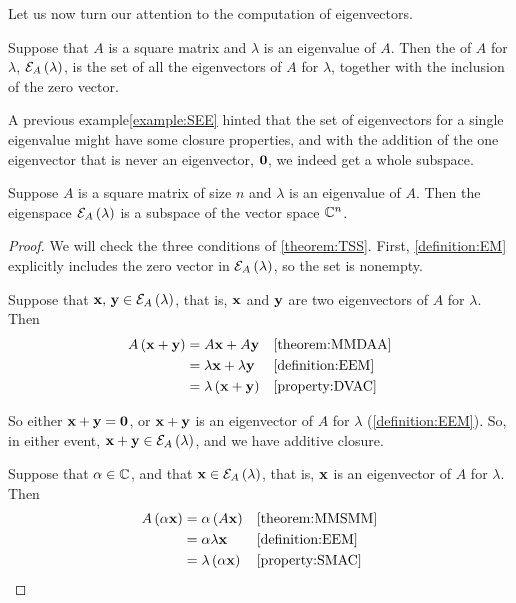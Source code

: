 \documentclass{ximera}
\begin{document}
Let us now turn our attention to the computation of eigenvectors.

\begin{definition}
  Suppose that $A$ is a square matrix and $\lambda$ is an eigenvalue
  of $A$.  Then the  of $A$ for $\lambda$,
  $\mathcal{E}_{A}\left(\lambda\right)$, is the set of all the eigenvectors of $A$
  for $\lambda$, together with the inclusion of the zero vector.
\end{definition}

A previous example\ref{example:SEE} hinted that the set of
eigenvectors for a single eigenvalue might have some closure
properties, and with the addition of the one eigenvector that is never
an eigenvector, $\mathbf{0}$, we indeed get a whole subspace.

\begin{theorem}
\label{theorem:EMS}

Suppose $A$ is a square matrix of size $n$ and $\lambda$ is an
eigenvalue of $A$.  Then the eigenspace $\mathcal{E}_{A}\left(\lambda\right)$ is a
subspace of the vector space $\mathbb{C}^{n}$.

\begin{proof}
  We will check the three conditions of \ref{theorem:TSS}.  First, \ref{definition:EM} explicitly includes the zero vector in $\mathcal{E}_{A}\left(\lambda\right)$, so the set is nonempty.
  
  Suppose that $\mathbf{x},\,\mathbf{y}\in\mathcal{E}_{A}\left(\lambda\right)$, that
  is, $\mathbf{x}$ and $\mathbf{y}$ are two eigenvectors of $A$ for
  $\lambda$.  Then
  \begin{align*}
    A\left(\mathbf{x}+\mathbf{y}\right)&=A\mathbf{x}+A\mathbf{y}&&\ref{theorem:MMDAA}\\
                                   &=\lambda\mathbf{x}+\lambda\mathbf{y}&&\ref{definition:EEM}\\
                                   &=\lambda\left(\mathbf{x}+\mathbf{y}\right)&&\ref{property:DVAC}
  \end{align*}

  So either $\mathbf{x}+\mathbf{y}=\mathbf{0}$, or $\mathbf{x}+\mathbf{y}$ is
  an eigenvector of $A$ for $\lambda$ (\ref{definition:EEM}). So, in
  either event, $\mathbf{x}+\mathbf{y}\in\mathcal{E}_{A}\left(\lambda\right)$, and we
  have additive closure.

  Suppose that $\alpha\in\mathbb{C}$, and that
  $\mathbf{x}\in\mathcal{E}_{A}\left(\lambda\right)$, that is, $\mathbf{x}$ is an
  eigenvector of $A$ for $\lambda$.  Then
  \begin{align*}
    A\left(\alpha\mathbf{x}\right)&=\alpha\left(A\mathbf{x}\right)&&\ref{theorem:MMSMM}\\
                                &=\alpha\lambda\mathbf{x}&&\ref{definition:EEM}\\
                                &=\lambda\left(\alpha\mathbf{x}\right)&&\ref{property:SMAC}
  \end{align*}


\end{proof}
\end{theorem}
\end{document}
